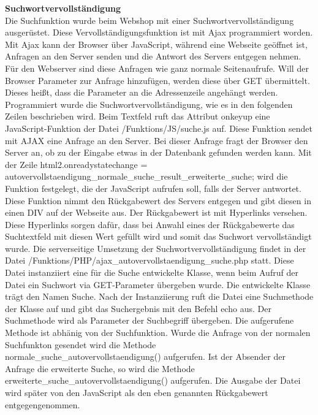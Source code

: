 \textbf{Suchwortvervollständigung}\\
Die Suchfunktion wurde beim Webshop mit einer Suchwortvervollständigung ausgerüstet. Diese Vervollständigungsfunktion ist mit Ajax programmiert worden. Mit Ajax kann der Browser über JavaScript, während eine Webseite geöffnet ist, Anfragen an den Server senden und die Antwort des Servers entgegen nehmen. Für den Webserver sind diese Anfragen wie ganz normale Seitenaufrufe. Will der Browser Parameter zur Anfrage hinzufügen, werden diese über \glqq GET\grqq{} übermittelt. Dieses heißt, dass die Parameter an die Adressenzeile angehängt werden.\\
Programmiert wurde die Suchwortvervollständigung, wie es in den folgenden Zeilen beschrieben wird. Beim Textfeld ruft das Attribut \glqq onkeyup\grqq{} eine JavaScript-Funktion der Datei \glqq /Funktions/JS/suche.js\grqq{} auf. Diese Funktion sendet mit AJAX eine Anfrage an den Server. Bei dieser Anfrage fragt der Browser den Server an, ob zu der Eingabe etwas in der Datenbank gefunden werden kann. Mit der Zeile \glqq html2.onreadystatechange = autovervollstaendigung\_normale\_suche\_result\_erweiterte\_suche;\grqq{} wird die Funktion festgelegt, die der JavaScript aufrufen soll, falls der Server antwortet. Diese Funktion nimmt den Rückgabewert des Servers entgegen und gibt diesen in einen DIV auf der Webseite aus.  Der Rückgabewert ist mit Hyperlinks versehen. Diese Hyperlinks sorgen dafür, dass bei Anwahl eines der Rückgabewerte das Suchtextfeld mit diesen Wert gefüllt wird und somit das Suchwort vervollständigt wurde. Die serverseitige Umsetzung der Suchwortvervollständigung findet in der Datei \glqq /Funktions/PHP/ajax\_autovervollstaendigung\_suche.php\grqq{} statt. Diese Datei instanziiert eine für die Suche entwickelte Klasse, wenn beim Aufruf der Datei ein Suchwort via GET-Parameter übergeben wurde. Die entwickelte Klasse trägt den Namen  \glqq Suche\grqq{}. Nach der Instanziierung ruft die Datei eine Suchmethode der Klasse auf und gibt das Suchergebnis mit den Befehl \glqq echo\grqq{} aus. Der Suchmethode wird als Parameter der Suchbegriff übergeben. Die aufgerufene Methode ist abhänig von der Suchfunktion. Wurde die Anfrage von der \glqq normalen\grqq{} Suchfunkton gesendet wird die Methode \glqq normale\_suche\_autovervollstaendigung()\grqq{} aufgerufen. Ist der Absender der Anfrage die \glqq erweiterte\grqq{} Suche, so wird die Methode \glqq erweiterte\_suche\_autovervollstaendigung()\grqq{} aufgerufen. Die Ausgabe der Datei wird später von den JavaScript als den eben genannten Rückgabewert entgegengenommen. \\

